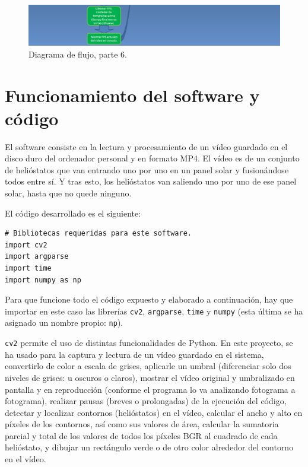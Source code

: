 \begin{figure}[h!]
  	\centering
	\includegraphics[width=\textwidth]{DiagramaFlujoSoftwareTFG/diagramaFlujo6.PNG}
	\caption{Diagrama de flujo, parte 6.
	\label{fig:DiagramaFlujoSoftwareTFG/diagramaFlujo6.PNG}}
\end{figure}

\section{Funcionamiento del software y código}

El software consiste en la lectura y procesamiento de un vídeo guardado en el disco duro del ordenador personal y en formato MP4. El vídeo es de un conjunto de helióstatos que van entrando uno por uno en un panel solar y fusionándose todos entre sí. Y tras esto, los helióstatos van saliendo uno por uno de ese panel solar, hasta que no quede ninguno.

El código desarrollado es el siguiente:\\[20pt]

\begin{lstlisting}
# Bibliotecas requeridas para este software.
import cv2
import argparse
import time
import numpy as np
\end{lstlisting}

Para que funcione todo el código expuesto y elaborado a continuación, hay que importar en este caso las librerías \verb|cv2|, \verb|argparse|, \verb|time| y \verb|numpy| (esta última se ha asignado un nombre propio: \verb|np|).

\verb|cv2| permite el uso de distintas funcionalidades de Python. En este proyecto, se ha usado para la captura y lectura de un vídeo guardado en el sistema, convertirlo de color a escala de grises, aplicarle un umbral (diferenciar solo dos niveles de grises: u oscuros o claros), mostrar el vídeo original y umbralizado en pantalla y en reproducción (conforme el programa lo va analizando fotograma a fotograma), realizar pausas (breves o prolongadas) de la ejecución del código, detectar y localizar contornos (helióstatos) en el vídeo, calcular el ancho y alto en píxeles de los contornos, así como sus valores de área, calcular la sumatoria parcial y total de los valores de todos los píxeles BGR al cuadrado de cada helióstato, y dibujar un rectángulo verde o de otro color alrededor del contorno en el vídeo.

